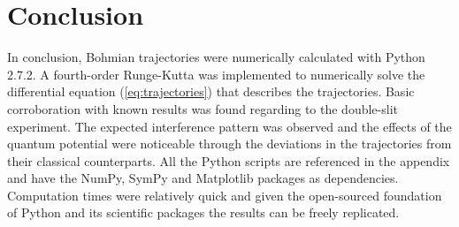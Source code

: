 \documentclass[10pt, reqno]{article}
\begin{document}

%

\section{Conclusion}

  In conclusion, Bohmian trajectories were numerically calculated with Python 2.7.2.
  A fourth-order Runge-Kutta was implemented to numerically solve the differential equation (\ref{eq:trajectories}) that describes the trajectories.
  Basic corroboration with known results was found regarding to the double-slit experiment.
  The expected interference pattern was observed and the effects of the quantum potential were noticeable through the deviations in the trajectories from their classical counterparts.
  All the Python scripts are referenced in the appendix and have the NumPy, SymPy and Matplotlib packages as dependencies.
  Computation times were relatively quick and given the open-sourced foundation of Python and its scientific packages the results can be freely replicated.
\end{document}
